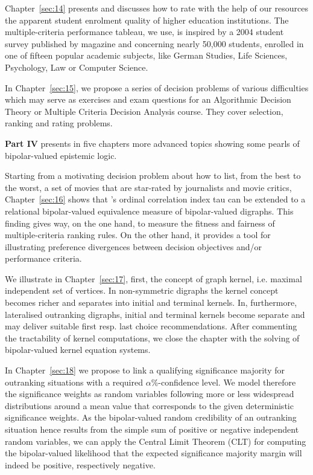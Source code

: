 Chapter~\ref{sec:14} presents and discusses how to rate with the help of our \Digraph resources the apparent student enrolment quality of higher education institutions. The multiple-criteria performance tableau, we use, is inspired by a 2004 student survey published by \Spiegel magazine and concerning nearly 50,000 students, enrolled in one of fifteen popular academic subjects, like German Studies, Life Sciences, Psychology, Law or Computer Science.

In Chapter~\ref{sec:15}, we propose a series of decision problems of various difficulties which may serve as exercises and exam questions for an Algorithmic Decision Theory or Multiple Criteria Decision Analysis course. They cover selection, ranking and rating problems.
\vspace{5pt}

\textbf{Part IV} presents in five chapters more advanced topics showing some pearls of bipolar-valued epistemic logic.

Starting from a motivating decision problem about how to list, from the best to the worst, a set of movies that are star-rated by journalists and movie critics, Chapter~\ref{sec:16} shows that \Kendall’s ordinal correlation index tau can be extended to a relational bipolar-valued equivalence measure of bipolar-valued digraphs. This finding gives way, on the one hand, to measure the fitness and fairness of multiple-criteria ranking rules. On the other hand, it provides a tool for illustrating preference divergences between decision objectives and/or performance criteria.

We illustrate in Chapter~\ref{sec:17}, first, the concept of graph kernel, i.e. maximal independent set of vertices. In non-symmetric digraphs the kernel concept becomes richer and separates into initial and terminal kernels. In, furthermore, lateralised outranking digraphs, initial and terminal kernels become separate and may deliver suitable first resp. last choice recommendations. After commenting the tractability of kernel computations, we close the chapter with the solving of bipolar-valued kernel equation systems.

In Chapter~\ref{sec:18} we propose to link a qualifying significance majority for outranking situations with a required $\alpha\%$-confidence level. We model therefore the significance weights as random variables following more or less widespread distributions around a mean value that corresponds to the given deterministic significance weights. As the bipolar-valued random credibility of an outranking situation hence results from the simple sum of positive or negative independent random variables, we can apply the Central Limit Theorem (CLT) for computing the bipolar-valued likelihood that the expected significance majority margin will indeed be positive, respectively negative.

